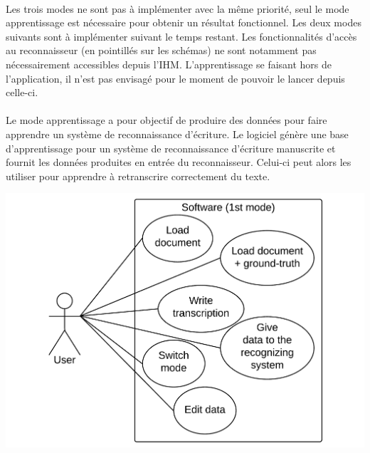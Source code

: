 \paragraph{}
Les trois modes ne sont pas à implémenter avec la même priorité, seul le mode
apprentissage est nécessaire pour obtenir un résultat fonctionnel. Les deux
modes suivants sont à implémenter suivant le temps restant. Les fonctionnalités d'accès au reconnaisseur (en pointillés sur les schémas) ne sont notamment pas nécessairement accessibles depuis l'IHM. L'apprentissage se faisant hors de l'application, il n'est pas envisagé pour le moment de pouvoir le lancer depuis celle-ci.

\paragraph{}
Le mode apprentissage a pour objectif de produire des données pour faire apprendre un système de reconnaissance d’écriture. 
Le logiciel génère une base d’apprentissage pour un
système de reconnaissance d’écriture manuscrite et fournit les données
produites en entrée du reconnaisseur. Celui-ci peut alors les utiliser pour
apprendre à retranscrire correctement du texte.

\begin{mdframed}[frametitle={Figure 2 : Diagramme de cas d'utilisation (mode apprentissage)}, innerbottommargin=10]
\begin{center}
\includegraphics[scale=0.4]{Usecase_1.pdf}
\end{center}
\end{mdframed}


\newpage

